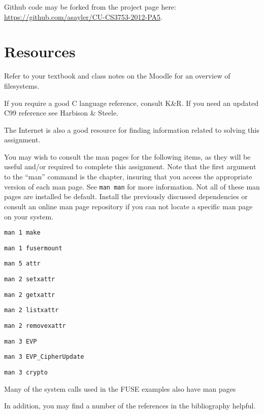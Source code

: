 \documentclass[12pt]{article}
\newenvironment{packed_item}{
\begin{itemize}
  \setlength{\itemsep}{1pt}
  \setlength{\parskip}{0pt}
  \setlength{\parsep}{0pt}
}{\end{itemize}}
\begin{document}
Github code may be forked from the project page here:\\
\url{https://github.com/asayler/CU-CS3753-2012-PA5}.

\section{Resources}
Refer to your textbook and class notes on the Moodle for an overview
of filesystems.

If you require a good C language reference, consult K\&R\cite{K+R}. If
you need an updated C99 reference see Harbison \& Steele\cite{H+S}.

The Internet\cite{tubes} is also a good resource for finding
information related to solving this assignment.

You may wish to consult the man pages for the following items, as they
will be useful and/or required to complete this assignment. Note that
the first argument to the ``man'' command is the chapter, insuring
that you access the appropriate version of each man page. See
\texttt{man man} for more information. Not all of these man pages are
installed be default. Install the previously discussed dependencies or
consult an online man page repository if you can not locate a specific
man page on your system.

\begin{packed_item}
\item \texttt{man 1 make}
\item \texttt{man 1 fusermount}
\item \texttt{man 5 attr}
\item \texttt{man 2 setxattr}
\item \texttt{man 2 getxattr}
\item \texttt{man 2 listxattr}
\item \texttt{man 2 removexattr}
\item \texttt{man 3 EVP}
\item \texttt{man 3 EVP\_CipherUpdate}
\item \texttt{man 3 crypto}
\item Many of the system calls used in the FUSE examples also have man pages
\end{packed_item}

In addition, you may find a number of the references in the bibliography helpful.
\end{document}
